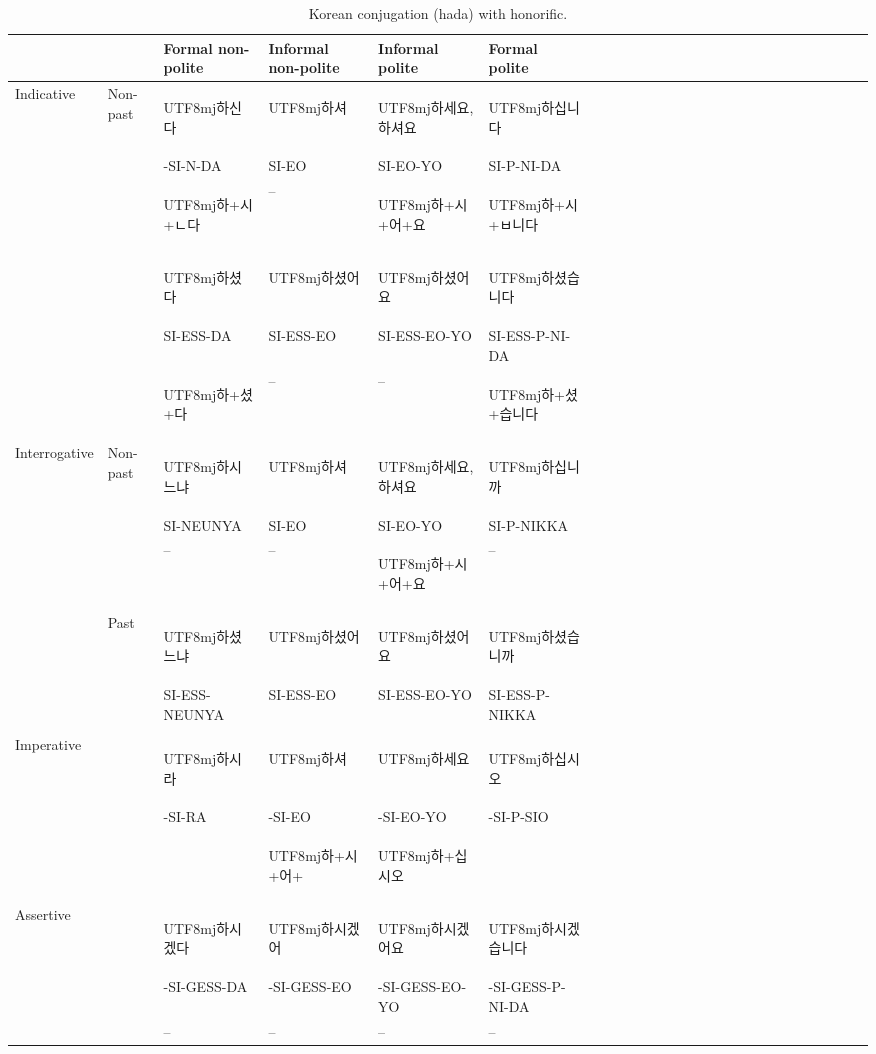 \documentclass[11pt,letterpaper]{article}
\newcommand{\korean}[1]{\begin{CJK}{UTF8}{mj}#1\end{CJK}}
\begin{document}
\begin{table}[]
    \centering
    \begin{tabular}{llllllllllllllllllllllllll}
           &          &Formal non-polite & Informal non-polite & Informal polite & Formal polite \\ \hline \hline
\multirow{2}{*}{Indicative} & Non-past & \korean{하신다} & \korean{하셔} & \korean{하세요, 하셔요} & \korean{하십니다} \\
                           && -SI-N-DA & SI-EO & SI-EO-YO & SI-P-NI-DA \\
&& \korean{하+시+ㄴ다}       &   --   &    \korean{하+시+어+요}             &  \korean{하+시+ㅂ니다}        \\
\hline
&& \korean{하셨다} & \korean{하셨어} & \korean{하셨어요} & \korean{하셨습니다} \\
&& SI-ESS-DA & SI-ESS-EO & SI-ESS-EO-YO & SI-ESS-P-NI-DA \\
& & \korean{하+셨+다}       &  --    &        --        &  \korean{하+셨+습니다}       \\
\hline
\multirow{2}{*}{Interrogative} & Non-past & \korean{하시느냐} & \korean{하셔} & \korean{하세요, 하셔요} & \korean{하십니까} \\
&& SI-NEUNYA & SI-EO & SI-EO-YO & SI-P-NIKKA \\
& &   --     &   --   &   \korean{하+시+어+요}             &  --        \\
\hline
& Past & \korean{하셨느냐} & \korean{하셨어} & \korean{하셨어요} & \korean{하셨습니까} \\
&      & SI-ESS-NEUNYA & SI-ESS-EO          & SI-ESS-EO-YO & SI-ESS-P-NIKKA \\
& &        &      &                &          \\
\hline
\multirow{2}{*}{Imperative} && \korean{하시라} & \korean{하셔} & \korean{하세요} & \korean{하십시오} \\
&& -SI-RA & -SI-EO & -SI-EO-YO & -SI-P-SIO \\
&        &      & \korean{하+시+어+}               &   \korean{하+십시오}       \\
\hline
\multirow{2}{*}{Assertive} & & \korean{하시겠다} & \korean{하시겠어} & \korean{하시겠어요} & \korean{하시겠습니다} \\
&        &  -SI-GESS-DA     &  -SI-GESS-EO              &  -SI-GESS-EO-YO & -SI-GESS-P-NI-DA        \\
&& -- & -- & -- & -- \\
    \end{tabular}
    \caption{Korean conjugation (hada) with honorific.}
    \label{tab:my_label}
\end{table}
\end{document}
